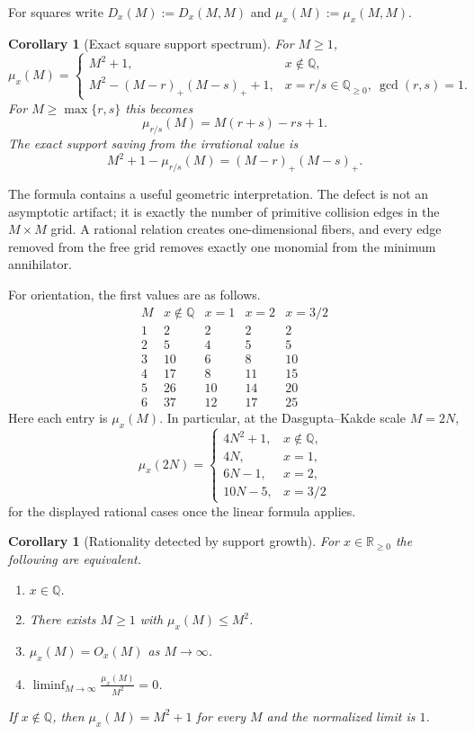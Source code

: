 \documentclass[11pt,oneside]{article}
\newtheorem{corollary}[theorem]{Corollary}
\theoremstyle{definition}
\theoremstyle{remark}
\newcommand{\Q}{\mathbb Q}
\newcommand{\R}{\mathbb R}
\begin{document}
For squares write $D_x(M):=D_x(M,M)$ and $\mu_x(M):=\mu_x(M,M)$.

\begin{corollary}[Exact square support spectrum]
\label{cor:square-support-spectrum}
For $M\ge1$,
\[
  \mu_x(M)=
  \begin{cases}
    M^2+1,&x\notin\Q,\\[2mm]
    M^2-(M-r)_+(M-s)_++1,
      &x=r/s\in\Q_{\ge0},\ \gcd(r,s)=1.
  \end{cases}
\]
For $M\ge\max\{r,s\}$ this becomes
\[
  \mu_{r/s}(M)=M(r+s)-rs+1.
\]
The exact support saving from the irrational value is
\[
  M^2+1-\mu_{r/s}(M)=(M-r)_+(M-s)_+.
\]
\end{corollary}

The formula contains a useful geometric interpretation.  The defect is not an asymptotic
artifact; it is exactly the number of primitive collision edges in the $M\times M$ grid.  A
rational relation creates one-dimensional fibers, and every edge removed from the free grid
removes exactly one monomial from the minimum annihilator.

For orientation, the first values are as follows.
\[
\begin{array}{c|c|c|c|c}
M&x\notin\Q&x=1&x=2&x=3/2\\ \hline
1&2&2&2&2\\
2&5&4&5&5\\
3&10&6&8&10\\
4&17&8&11&15\\
5&26&10&14&20\\
6&37&12&17&25
\end{array}
\]
Here each entry is $\mu_x(M)$.  In particular, at the Dasgupta--Kakde scale $M=2N$,
\[
  \mu_x(2N)=
  \begin{cases}
    4N^2+1,&x\notin\Q,\\
    4N,&x=1,\\
    6N-1,&x=2,\\
    10N-5,&x=3/2
  \end{cases}
\]
for the displayed rational cases once the linear formula applies.

\begin{corollary}[Rationality detected by support growth]
\label{cor:rationality-support}
For $x\in\R_{\ge0}$ the following are equivalent.
\begin{enumerate}
\item $x\in\Q$.
\item There exists $M\ge1$ with $\mu_x(M)\le M^2$.
\item $\mu_x(M)=O_x(M)$ as $M\to\infty$.
\item $\displaystyle\liminf_{M\to\infty}\frac{\mu_x(M)}{M^2}=0$.
\end{enumerate}
If $x\notin\Q$, then $\mu_x(M)=M^2+1$ for every $M$ and the normalized limit is $1$.
\end{corollary}
\end{document}
